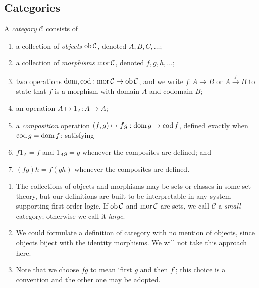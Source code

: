 \subsection{Categories}
\begin{definition}
    A \emph{category} \( \mathcal C \) consists of
    \begin{enumerate}
        \item a collection of \emph{objects} \( \operatorname{ob} \mathcal C \), denoted \( A, B, C, \dots \);
        \item a collection of \emph{morphisms} \( \operatorname{mor} \mathcal C \), denoted \( f, g, h, \dots \);
        \item two operations \( \operatorname{dom}, \operatorname{cod} : \operatorname{mor} \mathcal C \to \operatorname{ob} \mathcal C \), and we write \( f : A \to B \) or \( A \xrightarrow f B \) to state that \( f \) is a morphism with domain \( A \) and codomain \( B \);
        \item an operation \( A \mapsto 1_A : A \to A \);
        \item a \emph{composition} operation \( (f, g) \mapsto fg : \operatorname{dom} g \to \operatorname{cod} f \), defined exactly when \( \operatorname{cod} g = \operatorname{dom} f \); satisfying
        \item \( f 1_A = f \) and \( 1_A g = g \) whenever the composites are defined; and
        \item \( (fg)h = f(gh) \) whenever the composites are defined.
    \end{enumerate}
\end{definition}
\begin{remark}
    \begin{enumerate}
        \item The collections of objects and morphisms may be sets or classes in some set theory, but our definitions are built to be interpretable in any system supporting first-order logic.
        If \( \operatorname{ob} \mathcal C \) and \( \operatorname{mor} \mathcal C \) are sets, we call \( \mathcal C \) a \emph{small} category; otherwise we call it \emph{large}.
        \item We could formulate a definition of category with no mention of objects, since objects biject with the identity morphisms.
        We will not take this approach here.
        \item Note that we choose \( fg \) to mean `first \( g \) and then \( f \)'; this choice is a convention and the other one may be adopted.
    \end{enumerate}
\end{remark}

